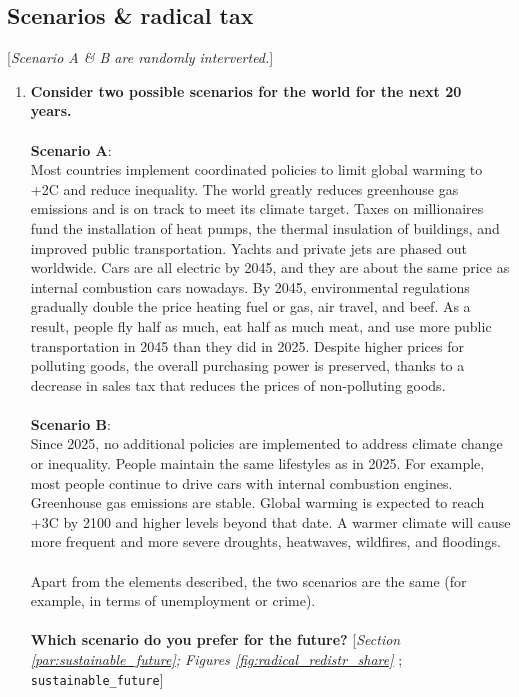 \subsection*{Scenarios \& radical tax} 
 [\textit{Scenario A \& B are randomly interverted.}]
 \begin{enumerate}[resume] 
\item  \label{q:sustainable_future} \textbf{Consider two possible scenarios for the world for the next 20 years.~\\\\Scenario A}: \\Most countries implement coordinated policies to limit global warming to +2\textdegree{}C and reduce inequality. The world greatly reduces greenhouse gas emissions and is on track to meet its climate target. Taxes on millionaires fund the installation of heat pumps, the thermal insulation of buildings, and improved public transportation. Yachts and private jets are phased out worldwide. Cars are all electric by 2045, and they are about the same price as internal combustion cars nowadays. By 2045, environmental regulations gradually double the price heating fuel or gas, air travel, and beef. As a result, people fly half as much, eat half as much meat, and use more public transportation in 2045 than they did in 2025. Despite higher prices for polluting goods, the overall purchasing power is preserved, thanks to a decrease in sales tax that reduces the prices of non-polluting goods.\\\\\textbf{Scenario B}:\\Since 2025, no additional policies are implemented to address climate change or inequality. People maintain the same lifestyles as in 2025. For example, most people continue to drive cars with internal combustion engines. Greenhouse gas emissions are stable. Global warming is expected to reach +3\textdegree{}C by 2100 and higher levels beyond that date. A warmer climate will cause more frequent and more severe droughts, heatwaves, wildfires, and floodings.\\\\Apart from the elements described, the two scenarios are the same (for example, in terms of unemployment or crime). \\\\\textbf{Which scenario do you prefer for the future?} [\textit{Section \ref{par:sustainable_future}; Figures \ref{fig:radical_redistr_share}%
}; 
\verb|sustainable_future|]

\end{enumerate}
